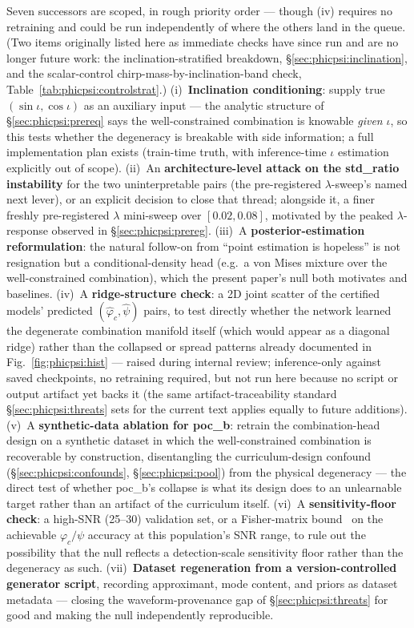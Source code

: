 \documentclass[11pt]{article}
\begin{document}
Seven successors are scoped, in rough priority order --- though (iv) requires no retraining and could be run independently of where the others land in the queue.
(Two items originally listed here as immediate checks have since run and are no longer future work: the inclination-stratified breakdown, \S\ref{sec:phicpsi:inclination}, and the scalar-control chirp-mass-by-inclination-band check, Table~\ref{tab:phicpsi:controlstrat}.)
(i)~\textbf{Inclination conditioning}: supply true $(\sin\iota, \cos\iota)$ as an auxiliary input --- the analytic structure of \S\ref{sec:phicpsi:prereq} says the well-constrained combination is knowable \emph{given} $\iota$, so this tests whether the degeneracy is breakable with side information; a full implementation plan exists (train-time truth, with inference-time $\iota$ estimation explicitly out of scope).
(ii)~An \textbf{architecture-level attack on the std\_ratio instability} for the two uninterpretable pairs (the pre-registered $\lambda$-sweep's named next lever), or an explicit decision to close that thread; alongside it, a finer freshly pre-registered $\lambda$ mini-sweep over $[0.02, 0.08]$, motivated by the peaked $\lambda$-response observed in \S\ref{sec:phicpsi:prereg}.
(iii)~A \textbf{posterior-estimation reformulation}: the natural follow-on from ``point estimation is hopeless'' is not resignation but a conditional-density head (e.g.\ a von Mises mixture over the well-constrained combination), which the present paper's null both motivates and baselines.
(iv)~A \textbf{ridge-structure check}: a 2D joint scatter of the certified models' predicted $(\hat\varphi_c, \hat\psi)$ pairs, to test directly whether the network learned the degenerate combination manifold itself (which would appear as a diagonal ridge) rather than the collapsed or spread patterns already documented in Fig.~\ref{fig:phicpsi:hist} --- raised during internal review; inference-only against saved checkpoints, no retraining required, but not run here because no script or output artifact yet backs it (the same artifact-traceability standard \S\ref{sec:phicpsi:threats} sets for the current text applies equally to future additions).
(v)~A \textbf{synthetic-data ablation for poc\_b}: retrain the combination-head design on a synthetic dataset in which the well-constrained combination is recoverable by construction, disentangling the curriculum-design confound (\S\ref{sec:phicpsi:confounds}, \S\ref{sec:phicpsi:pool}) from the physical degeneracy --- the direct test of whether poc\_b's collapse is what its design does to an unlearnable target rather than an artifact of the curriculum itself.
(vi)~A \textbf{sensitivity-floor check}: a high-SNR (25--30) validation set, or a Fisher-matrix bound~\citep{vallisneri2008fisher} on the achievable $\varphi_c/\psi$ accuracy at this population's SNR range, to rule out the possibility that the null reflects a detection-scale sensitivity floor rather than the degeneracy as such.
(vii)~\textbf{Dataset regeneration from a version-controlled generator script}, recording approximant, mode content, and priors as dataset metadata --- closing the waveform-provenance gap of \S\ref{sec:phicpsi:threats} for good and making the null independently reproducible.
\end{document}
